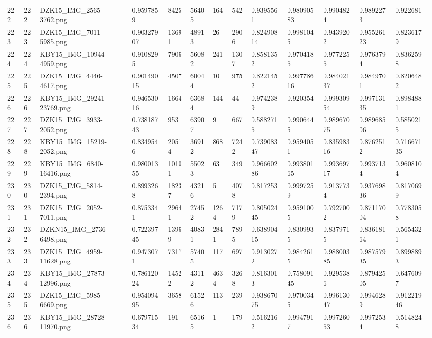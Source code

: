 \documentclass[11pt, a4paper, twoside]{report}
\begin{document}
\begin{longtable}[c]{@{}lllllllllllll@{}}
222 & 222 & DZK15\_IMG\_2565-3762.png & 0.9597859 & 8425 & 56405 & 164 & 542 & 0.9395561 & 0.98090583 & 0.9904824 & 0.9892273 & 0.922681 \\
223 & 223 & DZK15\_IMG\_7011-5985.png & 0.90327907 & 13691 & 48913 & 26 & 2906 & 0.82490814 & 0.9981045 & 0.9439202 & 0.95526123 & 0.8236179 \\
224 & 224 & KBY15\_IMG\_10944-4959.png & 0.9108295 & 7906 & 56082 & 241 & 1307 & 0.8581352 & 0.9704186 & 0.9772256 & 0.9763794 & 0.8362598 \\
225 & 225 & DZK15\_IMG\_4446-4617.png & 0.90149015 & 4507 & 60044 & 10 & 975 & 0.8221452 & 0.99778616 & 0.98402137 & 0.9849701 & 0.8206482 \\
226 & 226 & KBY15\_IMG\_29241-23769.png & 0.94653016 & 1664 & 63684 & 144 & 44 & 0.9742389 & 0.920354 & 0.99930954 & 0.99713135 & 0.8984881 \\
227 & 227 & DZK15\_IMG\_3933-2052.png & 0.73818743 & 953 & 63907 & 9 & 667 & 0.5882716 & 0.9906445 & 0.98967075 & 0.98968506 & 0.5850215 \\
228 & 228 & KBY15\_IMG\_15219-2052.png & 0.8349546 & 20514 & 36912 & 868 & 7242 & 0.73908347 & 0.9594051 & 0.83598316 & 0.8762512 & 0.71667135 \\
229 & 229 & KBY15\_IMG\_6840-16416.png & 0.98001355 & 10101 & 55023 & 63 & 349 & 0.96660286 & 0.99380165 & 0.99369717 & 0.9937134 & 0.9608104 \\
230 & 230 & DZK15\_IMG\_5814-2394.png & 0.8993268 & 18237 & 43216 & 5 & 4078 & 0.817253 & 0.9997259 & 0.9137734 & 0.93769836 & 0.8170699 \\
231 & 231 & DZK15\_IMG\_2052-7011.png & 0.8753341 & 29641 & 27452 & 1264 & 7179 & 0.80502445 & 0.9591005 & 0.7927002 & 0.87117004 & 0.7783058 \\
232 & 232 & DZKN15\_IMG\_2736-6498.png & 0.72239745 & 13969 & 40831 & 2841 & 7895 & 0.63890415 & 0.8309935 & 0.8379715 & 0.83618164 & 0.5654321 \\
233 & 233 & DZK15\_IMG\_4959-11628.png & 0.9473071 & 7317 & 57405 & 117 & 697 & 0.9130272 & 0.9842615 & 0.98800385 & 0.98757935 & 0.8998893 \\
234 & 234 & KBY15\_IMG\_27873-12996.png & 0.78612024 & 14522 & 43112 & 4634 & 3268 & 0.8163013 & 0.75809145 & 0.9295386 & 0.87942505 & 0.6476097 \\
235 & 235 & DZK15\_IMG\_5985-6669.png & 0.95409495 & 3658 & 61526 & 113 & 239 & 0.93867075 & 0.9700345 & 0.99613047 & 0.9946289 & 0.91221946 \\
236 & 236 & KBY15\_IMG\_28728-11970.png & 0.67971534 & 191 & 65165 & 1 & 179 & 0.5162162 & 0.9947917 & 0.99726063 & 0.9972534 & 0.5148248 \\

\end{longtable}
\end{document}
